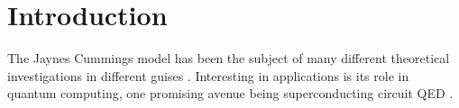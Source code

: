 \section{Introduction}
The Jaynes Cummings model has been the subject of many different theoretical investigations in different guises \cite{Abdalla2011}\cite{Benivegna1994}. Interesting in applications is its role in quantum computing, one promising avenue being superconducting circuit QED \cite{Blais2004a}.
